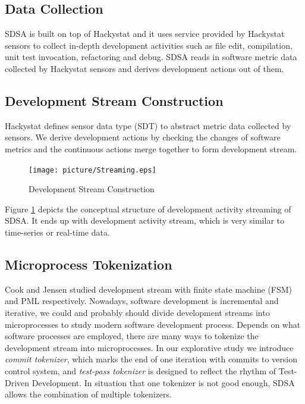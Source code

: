 \documentclass[11pt,twocolumn]{article}
\begin{document}
\subsection{Data Collection}
SDSA is built on top of Hackystat and it uses service provided by
Hackystat\cite{csdl2-02-07} sensors to collect in-depth development
activities such as file edit, compilation, unit test invocation,
refactoring and debug. SDSA reads in software metric data collected by
Hackystat sensors and derives development actions out of them.

\subsection{Development Stream Construction}
Hackystat defines sensor data type (SDT) to abstract metric data collected
by sensors. We derive development actions by checking the changes of
software metrics and the continuous actions merge together to form 
development stream.
\begin{figure}[ht] 
  \centering
  \texttt{[image: picture/Streaming.eps]}
  \caption{Development Stream Construction}\label{fig:Streaming}
\end{figure} 

Figure \ref{fig:Streaming} depicts the conceptual structure of development
activity streaming of SDSA. It ends up with development activity stream,
which is very similar to time-series or real-time data.

\subsection{Microprocess Tokenization}
Cook \cite{Cook:95} and Jensen \cite{Jensen:04} studied development stream
with finite state machine (FSM) and PML respectively. Nowadays, software
development is incremental and iterative, we could and probably should
divide development streams into microprocesses to study modern software
development process. Depends on what software processes are employed, there
are many ways to tokenize the development stream into microprocesses. In
our explorative study we introduce \textit{commit tokenizer}, which marks
the end of one iteration with commits to version control system, and
\textit{test-pass tokenizer} is designed to reflect the rhythm of
Test-Driven Development. In situation that one tokenizer is not good
enough, SDSA allows the combination of multiple tokenizers.
\end{document}
